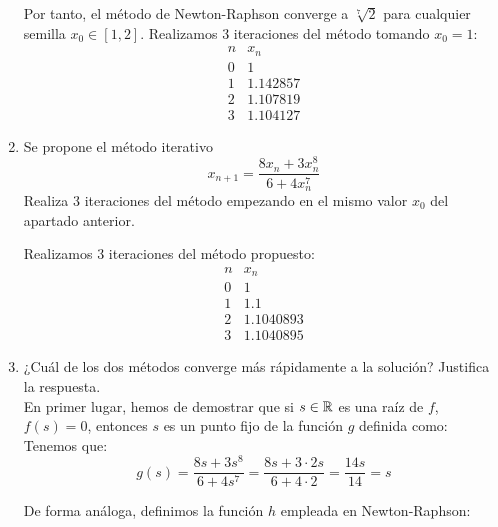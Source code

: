 \begin{ejercicio}
\begin{enumerate}
        Por tanto, el método de Newton-Raphson converge a $\sqrt[7]{2}$ para cualquier semilla $x_0\in [1, 2]$. Realizamos 3 iteraciones del método tomando $x_0=1$:
        \begin{equation*}
            \begin{array}{c|c}
                n & x_n\\ \hline
                0 & 1 \\
                1 & 1.142857\\
                2 & 1.107819\\
                3 & 1.104127
            \end{array}
        \end{equation*}
        \item Se propone el método iterativo
        \[
            x_{n+1} = \frac{8x_n + 3x_n^8}{6 + 4x_n^7}
        \]
        Realiza 3 iteraciones del método empezando en el mismo valor $x_0$ del apartado anterior.

        Realizamos 3 iteraciones del método propuesto:
        \begin{equation*}
            \begin{array}{c|c}
                n & x_n\\ \hline
                0 & 1 \\
                1 & 1.1\\
                2 & 1.1040893\\
                3 & 1.1040895
            \end{array}
        \end{equation*}
        \item ¿Cuál de los dos métodos converge más rápidamente a la solución? Justifica la respuesta.\\
        
        En primer lugar, hemos de demostrar que si $s\in \mathbb{R}$ es una raíz de $f$, $f(s)=0$, entonces $s$ es un punto fijo de la función $g$ definida como:
        Tenemos que:
        \begin{equation*}
            g(s)=\dfrac{8s + 3s^8}{6 + 4s^7} = \dfrac{8s+3\cdot 2s}{6+4\cdot 2} = \dfrac{14s}{14} = s
        \end{equation*}


        De forma análoga, definimos la función $h$ empleada en Newton-Raphson:


\end{enumerate}
\end{ejercicio}
